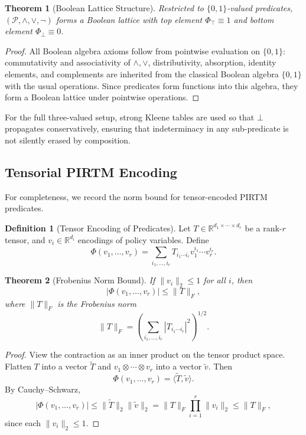 \documentclass[12pt,letterpaper]{article}
\theoremstyle{definition}
\newtheorem{definition}{Definition}[section]
\theoremstyle{plain}
\newtheorem{theorem}{Theorem}[section]
\theoremstyle{remark}
\begin{document}
\begin{theorem}[Boolean Lattice Structure]
Restricted to \(\{0,1\}\)-valued predicates, \((\mathcal{P}, \wedge, \vee, \neg)\) forms a Boolean lattice with top element \(\Phi_\top \equiv 1\) and bottom element \(\Phi_\bot \equiv 0\).
\end{theorem}

\begin{proof}
All Boolean algebra axioms follow from pointwise evaluation on \(\{0,1\}\):
commutativity and associativity of \(\wedge,\vee\), distributivity, absorption, identity elements, and complements are inherited from the classical Boolean algebra \( \{0,1\}\) with the usual operations. Since predicates form functions into this algebra, they form a Boolean lattice under pointwise operations.
\end{proof}

For the full three-valued setup, strong Kleene tables are used so that \(\bot\) propagates conservatively, ensuring that indeterminacy in any sub-predicate is not silently erased by composition.

\subsection{Tensorial PIRTM Encoding}
\label{subsec:tensor-encoding}

For completeness, we record the norm bound for tensor-encoded PIRTM predicates.

\begin{definition}[Tensor Encoding of Predicates]
Let \(T \in \mathbb{R}^{d_1 \times \cdots \times d_r}\) be a rank-\(r\) tensor, and \(v_i \in \mathbb{R}^{d_i}\) encodings of policy variables. Define
\[
\Phi(v_1,\dots,v_r) = \sum_{i_1,\dots,i_r} T_{i_1\cdots i_r} v_1^{i_1} \cdots v_r^{i_r}.
\]
\end{definition}

\begin{theorem}[Frobenius Norm Bound]
If \(\|v_i\|_2 \le 1\) for all \(i\), then
\[
|\Phi(v_1,\dots,v_r)| \le \|T\|_F,
\]
where \(\|T\|_F\) is the Frobenius norm
\[
\|T\|_F = \left(\sum_{i_1,\dots,i_r} |T_{i_1\cdots i_r}|^2\right)^{1/2}.
\]
\end{theorem}

\begin{proof}
View the contraction as an inner product on the tensor product space. Flatten \(T\) into a vector \(\tilde{T}\) and \(v_1 \otimes \cdots \otimes v_r\) into a vector \(\tilde{v}\). Then
\[
\Phi(v_1,\dots,v_r) = \langle \tilde{T}, \tilde{v} \rangle.
\]
By Cauchy–Schwarz,
\[
|\Phi(v_1,\dots,v_r)| \le \|\tilde{T}\|_2 \|\tilde{v}\|_2 = \|T\|_F \prod_{i=1}^r \|v_i\|_2 \le \|T\|_F,
\]
since each \(\|v_i\|_2 \le 1\).
\end{proof}
\nocite{*}
  

\end{document}
